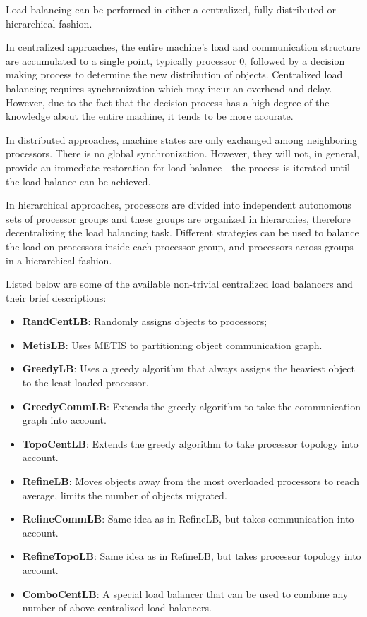 \label{lbStrategy}

Load balancing can be performed in either a centralized, fully distributed
or hierarchical fashion.

In centralized approaches, the entire machine's load and communication
structure are accumulated to a single point, typically processor 0, followed by
a decision making process to determine the new distribution of \charmpp
objects. Centralized load balancing requires synchronization which may incur an
overhead and delay. However, due to the fact that the decision process has a
high degree of the knowledge about the entire machine, it tends to be more
accurate.

In distributed approaches, machine states are only exchanged among 
neighboring processors. There is no global synchronization. However,
they will not, in general, provide an immediate restoration for load balance -
the process is iterated until the load balance can be achieved.

In hierarchical approaches, processors are divided into independent autonomous
sets of processor groups and these groups are organized in hierarchies,
therefore decentralizing the load balancing task. Different strategies can be
used to balance the load on processors inside each processor group, and
processors across groups in a hierarchical fashion.

Listed below are some of the available non-trivial centralized load balancers
and their brief descriptions:
\begin{itemize}
\item {\bf RandCentLB}:   Randomly assigns objects to processors;
\item {\bf MetisLB}:      Uses METIS\texttrademark\hspace{0mm} to partitioning object communication graph.
\item {\bf GreedyLB}:   Uses a greedy algorithm that always assigns the heaviest object to the least loaded processor.
\item {\bf GreedyCommLB}:  Extends the greedy algorithm to take the communication graph into account.
\item {\bf TopoCentLB}:    Extends the greedy algorithm to take processor topology into account.
\item {\bf RefineLB}:     Moves objects away from the most overloaded processors to reach average, limits the number of objects migrated.
\item {\bf RefineCommLB}:     Same idea as in RefineLB, but takes communication into account.
\item {\bf RefineTopoLB}:       Same idea as in RefineLB, but takes processor topology into account.
\item {\bf ComboCentLB}:  A special load balancer that can be used to combine any number of above centralized load balancers.
\end{itemize}

